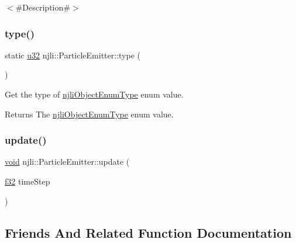 $<$\#\+Description\#$>$ \mbox{\label{classnjli_1_1_particle_emitter_a8d2f4b745a5f1529e87a15eebb5f9487}} 
\subsubsection{\texorpdfstring{type()}{type()}}
{\footnotesize\ttfamily static \mbox{\hyperlink{_util_8h_a10e94b422ef0c20dcdec20d31a1f5049}{u32}} njli\+::\+Particle\+Emitter\+::type (\begin{DoxyParamCaption}{ }\end{DoxyParamCaption})\hspace{0.3cm}{\ttfamily [static]}}

Get the type of \mbox{\hyperlink{namespacenjli_a6d56d4fbaf89fcf3e3d32839df05b444}{njli\+Object\+Enum\+Type}} enum value.

\begin{DoxyReturn}{Returns}
The \mbox{\hyperlink{namespacenjli_a6d56d4fbaf89fcf3e3d32839df05b444}{njli\+Object\+Enum\+Type}} enum value. 
\end{DoxyReturn}
\mbox{\label{classnjli_1_1_particle_emitter_a725f9fc883364849ab9d69ded574328f}} 
\subsubsection{\texorpdfstring{update()}{update()}}
{\footnotesize\ttfamily \mbox{\hyperlink{_thread_8h_af1e856da2e658414cb2456cb6f7ebc66}{void}} njli\+::\+Particle\+Emitter\+::update (\begin{DoxyParamCaption}\item[{\mbox{\hyperlink{_util_8h_a5f6906312a689f27d70e9d086649d3fd}{f32}}}]{time\+Step }\end{DoxyParamCaption})\hspace{0.3cm}{\ttfamily [protected]}}



\subsection{Friends And Related Function Documentation}
\mbox{\label{classnjli_1_1_particle_emitter_a6db9d28bd448a131448276ee03de1e6d}} 
